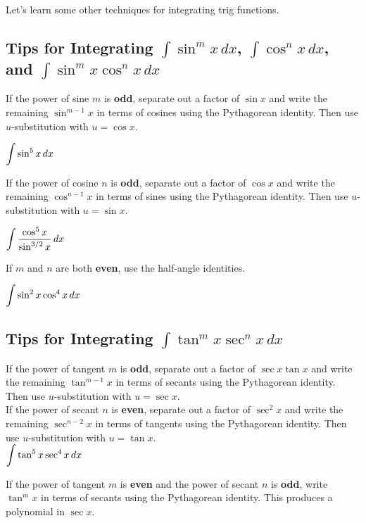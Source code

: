 \documentclass[12pt]{article}
\begin{document}
\vfill

Let's learn some other techniques for integrating trig functions.

\newpage

\subsection*{Tips for Integrating $\int\sin^m x\,dx$, $\int\cos^nx\,dx$, and $\int\sin^m x\cos^n x\,dx$}

If the power of sine $m$ is \textbf{odd}, separate out a factor of $\sin x$ and write the remaining $\sin^{m-1}x$ in terms of cosines using the Pythagorean identity. Then use $u$-substitution with $u=\cos x$.

\Example $\displaystyle\int\sin^5 x\,dx$

\vfill

If the power of cosine $n$ is \textbf{odd}, separate out a factor of $\cos x$ and write the remaining $\cos^{n-1}x$ in terms of sines using the Pythagorean identity. Then use $u$-substitution with $u=\sin x$.

\Example $\displaystyle\int\frac{\cos^5 x}{\sin^{3/2}x}\,dx$

\vfill

\newpage

If $m$ and $n$ are both \textbf{even}, use the half-angle identities.

\Example $\displaystyle\int\sin^2x\cos^4x\,dx$

\newpage

\subsection*{Tips for Integrating $\int\tan^m x\sec^nx\,dx$}
%
If the power of tangent $m$ is \textbf{odd}, separate out a factor of $\sec x\tan x$ and write the remaining $\tan^{m-1}x$ in terms of secants using the Pythagorean identity. Then use $u$-substitution with $u=\sec x$.\\

If the power of secant $n$ is \textbf{even}, separate out a factor of $\sec^2x$ and write the remaining $\sec^{n-2}x$ in terms of tangents using the Pythagorean identity. Then use $u$-substitution with $u=\tan x$. \\

\Example $\displaystyle\int\tan^5 x\sec^4x\,dx$

\newpage

If the power of tangent $m$ is \textbf{even} and the power of secant $n$ is \textbf{odd}, write $\tan^m x$ in terms of secants using the Pythagorean identity. This produces a polynomial in $\sec x$. 
\end{document}
